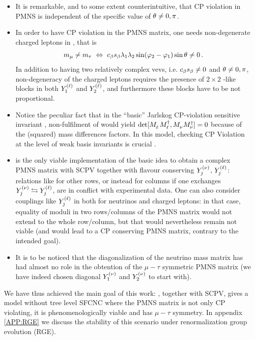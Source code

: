 \documentclass[12pt,a4paper]{article}
\begin{document}
\begin{itemize}
 \item It is remarkable, and to some extent counterintuitive, that CP violation in PMNS is independent of the specific value of $\theta_{}\neq 0,\pi$.
 \item In order to have CP violation in the PMNS matrix, one needs non-degenerate charged leptons in , that is
 \begin{equation}\label{eq:NonDegenerate:00}
 m_\mu\neq m_\tau\ \Leftrightarrow\ \Cb\Sb\lambda_1\lambda_2\sin(\varphi_2-\varphi_1)\sin\vevPh{}\neq 0\,.
\end{equation}
 In addition to having two relatively complex vevs, i.e. $c_\beta s_\beta\neq 0$ and $\theta_{}\neq 0,\pi$, non-degeneracy of the charged leptons requires the presence of $2\times 2$ -like blocks in both $Y_{1}^{\rm (\ell)}$ and $Y_{2}^{\rm (\ell)}$, and furthermore these blocks have to be not proportional.
 \item Notice the peculiar fact that in the ``basic'' Jarlskog CP-violation sensitive invariant \cite{Jarlskog:1985ht,Bernabeu:1986fc,Botella:1994cs}, non-fulfilment of  would yield $\det[\mML\mMLd,\mMN\mMNd]=0$ because of the (squared) mass differences factors. In this model, checking CP Violation at the level of weak basis invariants is crucial \cite{Botella:2012ab}.
 \item {} is the only viable implementation of the basic idea to obtain a complex PMNS matrix with SCPV together with flavour conserving $Y_{j}^{\rm (\nu)}$, $Y_{j}^{\rm (\ell)}$: relations like  for other rows, or instead for columns if one exchanges $Y_{j}^{\rm (\nu)}\leftrightarrows Y_{j}^{\rm (\ell)}$, are in conflict with experimental data. One can also consider couplings like $Y_{j}^{\rm (\ell)}$ in  both for neutrinos and charged leptons: in that case, equality of moduli in two rows/columns of the PMNS matrix would not extend to the whole row/column, but that would nevertheless remain not viable (and would lead to a CP conserving PMNS matrix, contrary to the intended goal).
 \item It is to be noticed that the diagonalization of the neutrino mass matrix has had almost no role in the obtention of the $\mu-\tau$ symmetric PMNS matrix (we have indeed chosen diagonal $Y_{1}^{\rm (\nu)}$ and $Y_{2}^{\rm (\nu)}$ to start with).
\end{itemize}
We have thus achieved the main goal of this work: , together with SCPV, gives a model without tree level SFCNC where the PMNS matrix is not only CP violating, it is phenomenologically viable and has $\mu-\tau$ symmetry. In appendix \ref{APP:RGE} we discuss the stability of this scenario under renormalization group evolution (RGE).
\end{document}
